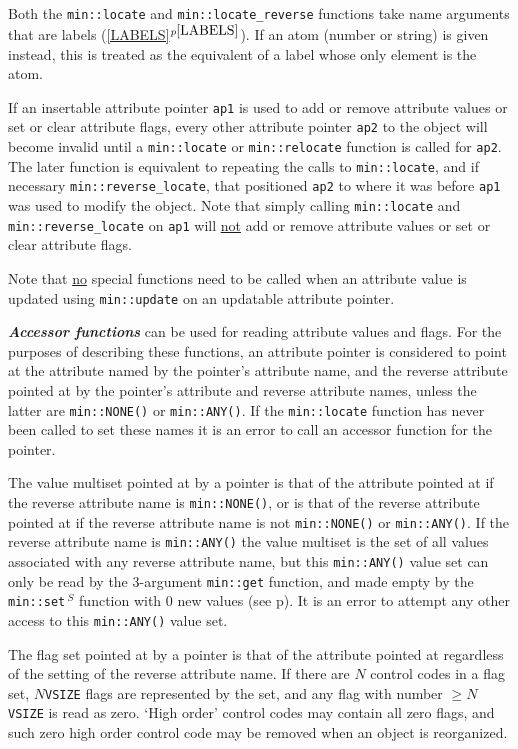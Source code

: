 \documentclass[12pt]{article}
\newcommand{\ikey}[2]{{\bf \em #1}\index{#2}}
\newcommand{\itemref}[1]{\ref{#1}$^{p\pageref{#1}}$}
\newcommand{\pagref}[1]{p\pageref{#1}}
\newcommand{\EOL}{\penalty \exhyphenpenalty}
\newcommand{\RESIZE}{$\,^S$}
\begin{document}
Both the {\tt min::\EOL locate} and {\tt min::\EOL locate\_reverse}
functions take name
arguments that are labels (\itemref{LABELS}).  If an atom (number or
string) is given instead, this is treated as the equivalent of
a label whose only element is the atom.

If an insertable attribute pointer {\tt ap1} is used
to add or remove attribute values or set or clear attribute flags,
every other attribute pointer {\tt ap2}
to the object will become invalid until a {\tt min::\EOL locate} or
{\tt min::\EOL relocate} function is called for {\tt ap2}.  The later
function is equivalent to repeating the calls to {\tt min::\EOL locate},
and if necessary {\tt min::\EOL reverse\_\EOL locate}, that positioned
{\tt ap2} to where it was before {\tt ap1} was used to modify the object.
Note that simply calling {\tt min::\EOL locate}
and {\tt min::\EOL reverse\_\EOL locate} on {\tt ap1} will
\underline{not} add or remove attribute values or set or clear attribute flags.

Note that \underline{no} special functions need to be called when an attribute
value is updated using {\tt min::\EOL update} on
an updatable attribute pointer.

\ikey{Accessor functions}{accessor function}
can be used for reading attribute values and flags.
For the purposes of describing these functions,
an attribute pointer is considered to point at the attribute
named by the pointer's attribute name, and the reverse attribute
pointed at by the pointer's attribute and reverse attribute names,
unless the latter are \verb|min::NONE()| or \verb|min::ANY()|.
If the {\tt min::\EOL locate} function has never been called to set
these names it is an error to call an accessor
function for the pointer.

The value multiset pointed at by a pointer is that of the attribute pointed
at if the reverse attribute name is \verb|min::NONE()|, or is that of
the reverse attribute pointed at if the reverse attribute name is not
\verb|min::NONE()| or \verb|min::ANY()|.
If the reverse attribute name is \verb|min::ANY()| the value multiset is
the set of all values associated with any reverse attribute name, but
this \verb|min::ANY()|
value set can only be read by the 3-argument \verb|min::get|
function, and made empty by the {\tt min::\EOL set\RESIZE}
function with 0 new values (see \pagref{MIN::SET_DELETE_ANY}).
It is an error to attempt any other access to this \verb|min::ANY()| value set.

The flag set pointed at by a pointer is that of the attribute pointed
at regardless of the setting of the reverse attribute name.
If there are $N$ control codes in a flag set, $N${\tt *VSIZE} flags are
represented by the set, and any flag with number $\geq N${\tt *VSIZE} is
read as zero.  `High order' control codes may contain all zero flags,
and such zero high order control code may be removed when an object
is reorganized.
\end{document}
